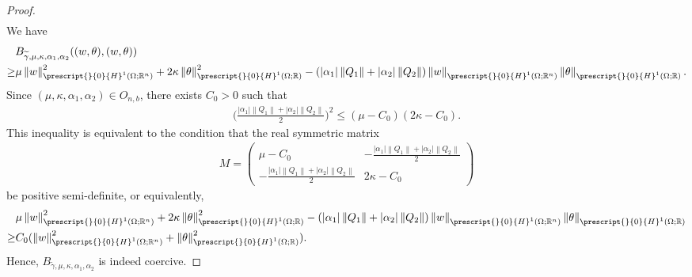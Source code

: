 \documentclass[11pt,letterpaper,reqno]{amsart}
\numberwithin{equation}{section}
\newcommand{\abs}[1]{\left\lvert#1\right\rvert}
\newcommand{\norm}[1]{\left\lVert#1\right\rVert}
\begin{document}
\begin{proof}
\begin{align}
\end{align}
We have
\begin{align}
    &B_{\widetilde{\gamma},\mu,\kappa,\alpha_{1},\alpha_{2}}((w,\theta),(w,\theta)) \nonumber \\
    \geq &\mu\norm{w}_{\prescript{}{0}{H}^{1}(\Omega;\mathbb{R}^{n})}^{2}+2\kappa\norm{\theta}_{\prescript{}{0}{H}^{1}(\Omega;\mathbb{R})}^{2}-(\abs{\alpha_{1}}\norm{Q_{1}}+\abs{\alpha_{2}}\norm{Q_{2}})\norm{w}_{\prescript{}{0}{H}^{1}(\Omega;\mathbb{R}^{n})}\norm{\theta}_{\prescript{}{0}{H}^{1}(\Omega;\mathbb{R})}.
\end{align}
Since \((\mu,\kappa,\alpha_{1},\alpha_{2}) \in O_{n,b}\), there exists \(C_{0}>0\) such that
\begin{align}
    \biggl(\frac{\abs{\alpha_{1}}\norm{Q_{1}}+\abs{\alpha_{2}}\norm{Q_{2}}}{2}\biggr)^{2} \leq (\mu-C_{0})(2\kappa-C_{0}).
\end{align}
This inequality is equivalent to the condition that the real symmetric matrix
\begin{align}
    M=
    \begin{pmatrix}
        \mu-C_{0} & -\frac{\abs{\alpha_{1}}\norm{Q_{1}}+\abs{\alpha_{2}}\norm{Q_{2}}}{2} \\
        -\frac{\abs{\alpha_{1}}\norm{Q_{1}}+\abs{\alpha_{2}}\norm{Q_{2}}}{2} & 2\kappa - C_{0}
    \end{pmatrix}
\end{align}
be positive semi-definite, or equivalently,
\begin{align}
    &\mu\norm{w}_{\prescript{}{0}{H}^{1}(\Omega;\mathbb{R}^{n})}^{2}+2\kappa\norm{\theta}_{\prescript{}{0}{H}^{1}(\Omega;\mathbb{R})}^{2}-(\abs{\alpha_{1}}\norm{Q_{1}}+\abs{\alpha_{2}}\norm{Q_{2}})\norm{w}_{\prescript{}{0}{H}^{1}(\Omega;\mathbb{R}^{n})}\norm{\theta}_{\prescript{}{0}{H}^{1}(\Omega;\mathbb{R})} \nonumber\\
    \geq &C_{0}(\norm{w}_{\prescript{}{0}{H}^{1}(\Omega;\mathbb{R}^{n})}^{2}+\norm{\theta}_{\prescript{}{0}{H}^{1}(\Omega;\mathbb{R})}^{2}).
\end{align}
Hence, \(B_{\widetilde{\gamma},\mu,\kappa,\alpha_{1},\alpha_{2}}\) is indeed coercive.
\end{proof}
\end{document}
